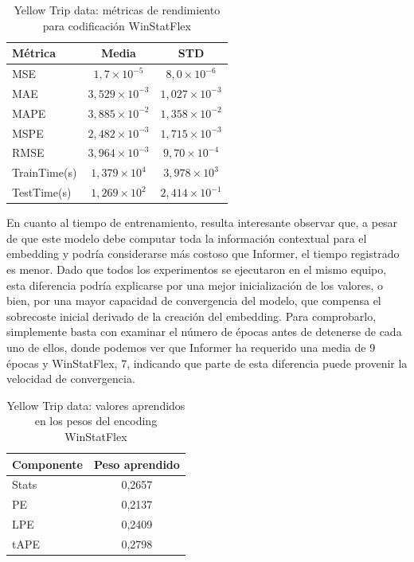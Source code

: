 \begin{table}[!ht]
	\centering
	\begin{tabular}{l|c|c}
		\toprule
		Métrica & Media & STD \\
		\midrule
		MSE & $1,7 \times 10^{-5}$ & $8,0 \times 10^{-6}$ \\
		MAE & $3,529 \times 10^{-3}$ & $1,027 \times 10^{-3}$ \\
		MAPE & $3,885 \times 10^{-2}$ & $1,358 \times 10^{-2}$ \\
		MSPE & $2,482 \times 10^{-3}$ & $1,715 \times 10^{-3}$ \\
		RMSE & $3,964 \times 10^{-3}$ & $9,70 \times 10^{-4}$ \\
		TrainTime(s) & $1,379 \times 10^{4}$ & $3,978 \times 10^{3}$ \\
		TestTime(s) & $1,269 \times 10^{2}$ & $2,414 \times 10^{-1}$ \\
		\bottomrule
	\end{tabular}
	\caption{Yellow Trip data: métricas de rendimiento para codificación WinStatFlex}
	\label{taxiflex}
\end{table}

En cuanto al tiempo de entrenamiento, resulta interesante observar que, a pesar de que este modelo debe computar toda la información contextual para el embedding y podría considerarse más costoso que Informer, el tiempo registrado es menor. Dado que todos los experimentos se ejecutaron en el mismo equipo, esta diferencia podría explicarse por una mejor inicialización de los valores, o bien, por una mayor capacidad de convergencia del modelo, que compensa el sobrecoste inicial derivado de la creación del embedding. Para comprobarlo, simplemente basta con examinar el número de épocas antes de detenerse de cada uno de ellos, donde podemos ver que Informer ha requerido una media de 9 épocas y WinStatFlex, 7, indicando que parte de esta diferencia puede provenir la velocidad de convergencia. 

\begin{table}[!ht]
	\centering
	\begin{tabular}{l|c}
	\toprule
	Componente & Peso aprendido \\
	\midrule
	Stats & 0,2657 \\
	PE & 0,2137 \\
	LPE & 0,2409 \\
	tAPE & 0,2798 \\
	\bottomrule
\end{tabular}
	\caption{Yellow Trip data: valores aprendidos en los pesos del encoding WinStatFlex}
\label{taxiflexpesos}
\end{table}

